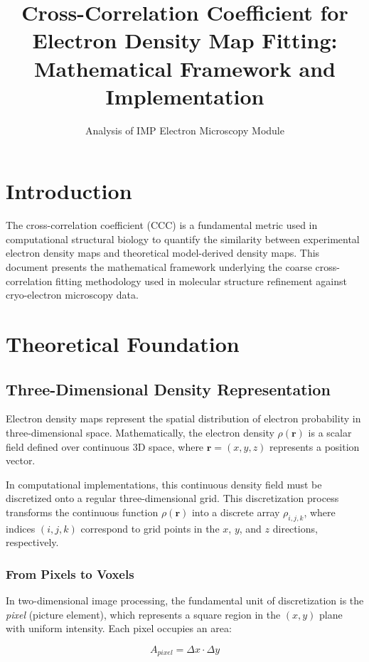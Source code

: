 \documentclass[12pt,a4paper]{article}
\title{Cross-Correlation Coefficient for Electron Density Map Fitting:
Mathematical Framework and Implementation}
\author{Analysis of IMP Electron Microscopy Module}
\date{}
\begin{document}
\maketitle

\section{Introduction}

The cross-correlation coefficient (CCC) is a fundamental metric 
used in computational structural biology to quantify the similarity 
between experimental electron density maps and theoretical model-derived 
density maps. This document presents the mathematical framework underlying 
the coarse cross-correlation fitting methodology used in molecular structure 
refinement against cryo-electron microscopy data.

\section{Theoretical Foundation}
\subsection{Three-Dimensional Density Representation}

Electron density maps represent the spatial distribution of 
electron probability in three-dimensional space. Mathematically, 
the electron density $\rho(\mathbf{r})$ is a scalar field defined 
over continuous 3D space, where $\mathbf{r} = (x, y, z)$ represents 
a position vector.

In computational implementations, this continuous density field 
must be discretized onto a regular three-dimensional grid. This 
discretization process transforms the continuous function 
$\rho(\mathbf{r})$ into a discrete array $\rho_{i,j,k}$, where 
indices $(i,j,k)$ correspond to grid points in the $x$, $y$, and $z$ 
directions, respectively.

\subsubsection{From Pixels to Voxels}

In two-dimensional image processing, the fundamental unit of 
discretization is the \textit{pixel} (picture element), which 
represents a square region in the $(x,y)$ plane with uniform 
intensity. Each pixel occupies an area:

\begin{equation}
A_{pixel} = \Delta x \cdot \Delta y
\end{equation}
\end{document}
